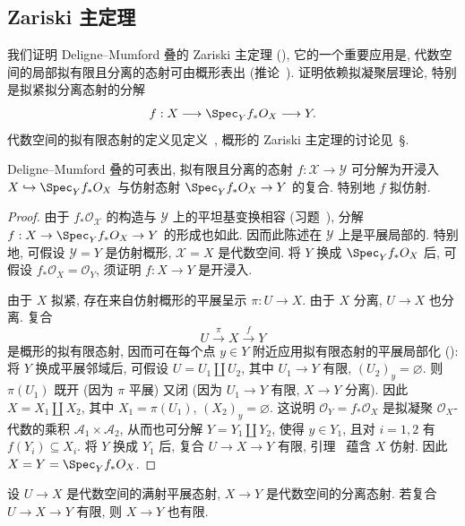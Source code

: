 \subsection{Zariski 主定理}\label{src:5.5.2-subsection}
我们证明 Deligne--Mumford 叠的 Zariski 主定理 (), 它的一个重要应用是, 代数空间的局部拟有限且分离的态射可由概形表出 (推论~). 证明依赖拟凝聚层理论, 特别是拟紧拟分离态射的分解
\[
f:\mathcal X\longrightarrow\Spec_{\mathcal Y}f_*\mathcal O_{\mathcal X}\longrightarrow\mathcal Y.
\]
代数空间的拟有限态射的定义见定义~, 概形的 Zariski 主定理的讨论见~\S{}.
\begin{proposition}\label{src:5.5.5}
Deligne--Mumford 叠的可表出, 拟有限且分离的态射 $f:\mathcal X\to\mathcal Y$ 可分解为开浸入 $\mathcal X\hookrightarrow\Spec_{\mathcal Y}f_*\mathcal O_{\mathcal X}$ 与仿射态射 $\Spec_{\mathcal Y}f_*\mathcal O_{\mathcal X}\to\mathcal Y$ 的复合. 特别地 $f$ 拟仿射.
\end{proposition}
\begin{proof}
由于 $f_*\mathcal O_{\mathcal X}$ 的构造与 $\mathcal Y$ 上的平坦基变换相容 (习题~), 分解 $f:\mathcal X\to\Spec_{\mathcal Y}f_*\mathcal O_{\mathcal X}\to\mathcal Y$ 的形成也如此. 因而此陈述在 $\mathcal Y$ 上是平展局部的. 特别地, 可假设 $\mathcal Y=Y$ 是仿射概形, $\mathcal X=X$ 是代数空间. 将 $Y$ 换成 $\Spec_Y f_*\mathcal O_X$ 后, 可假设 $f_*\mathcal O_X=\mathcal O_Y$, 须证明 $f:X\to Y$ 是开浸入.

由于 $X$ 拟紧, 存在来自仿射概形的平展呈示 $\pi:U\to X$. 由于 $X$ 分离, $U\to X$ 也分离. 复合
\[
U\xrightarrow{\pi}X\xrightarrow{f}Y
\]
是概形的拟有限态射, 因而可在每个点 $y\in Y$ 附近应用拟有限态射的平展局部化 (): 将 $Y$ 换成平展邻域后, 可假设 $U=U_1\amalg U_2$, 其中 $U_1\to Y$ 有限, $(U_2)_y=\varnothing$. 则 $\pi(U_1)$ 既开 (因为 $\pi$ 平展) 又闭 (因为 $U_1\to Y$ 有限, $X\to Y$ 分离). 因此 $X=X_1\amalg X_2$, 其中 $X_1=\pi(U_1)$, $(X_2)_y=\varnothing$. 这说明 $\mathcal O_Y=f_*\mathcal O_X$ 是拟凝聚 $\mathcal O_X$-代数的乘积 $\mathcal A_1\times\mathcal A_2$, 从而也可分解 $Y=Y_1\amalg Y_2$, 使得 $y\in Y_1$, 且对 $i=1,2$ 有 $f(Y_i)\subseteq X_i$. 将 $Y$ 换成 $Y_1$ 后, 复合 $U\to X\to Y$ 有限, 引理~ 蕴含 $X$ 仿射. 因此 $X=Y=\Spec_Y f_*\mathcal O_X$.
\end{proof}
\begin{lemma}\label{src:5.5.6}
设 $U\to X$ 是代数空间的满射平展态射, $X\to Y$ 是代数空间的分离态射. 若复合 $U\to X\to Y$ 有限, 则 $X\to Y$ 也有限.
\end{lemma}

